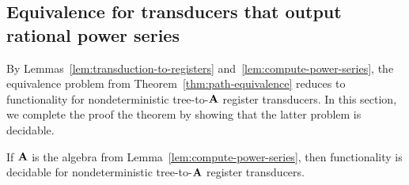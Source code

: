 \subsection{Equivalence for transducers that output rational power series}
\label{sec:decide-power-series}
By Lemmas~\ref{lem:transduction-to-registers} and~\ref{lem:compute-power-series}, the  equivalence problem from Theorem~\ref{thm:path-equivalence} reduces to functionality for nondeterministic tree-to-$\mathbf{A}$ register transducers. In this section, we complete the proof the theorem by showing that the latter problem is decidable.
\begin{lemma}\label{lem:functionality-decidable-power-series} If $\mathbf{A}$ is the algebra from Lemma~\ref{lem:compute-power-series}, then functionality is decidable for nondeterministic tree-to-$\mathbf{A}$ register transducers. 
\end{lemma}

